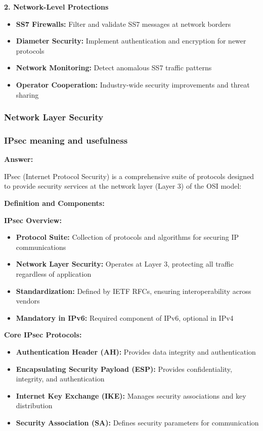 \documentclass[12pt,a4paper]{article}
\begin{document}
\textbf{2. Network-Level Protections}
\begin{itemize}
    \item \textbf{SS7 Firewalls:} Filter and validate SS7 messages at network borders
    \item \textbf{Diameter Security:} Implement authentication and encryption for newer protocols
    \item \textbf{Network Monitoring:} Detect anomalous SS7 traffic patterns
    \item \textbf{Operator Cooperation:} Industry-wide security improvements and threat sharing
\end{itemize}

\subsubsection{Network Layer Security}

\subsubsection{IPsec meaning and usefulness}

\textbf{Answer:}

IPsec (Internet Protocol Security) is a comprehensive suite of protocols designed to provide security services at the network layer (Layer 3) of the OSI model:

\textbf{Definition and Components:}

\textbf{IPsec Overview:}
\begin{itemize}
    \item \textbf{Protocol Suite:} Collection of protocols and algorithms for securing IP communications
    \item \textbf{Network Layer Security:} Operates at Layer 3, protecting all traffic regardless of application
    \item \textbf{Standardization:} Defined by IETF RFCs, ensuring interoperability across vendors
    \item \textbf{Mandatory in IPv6:} Required component of IPv6, optional in IPv4
\end{itemize}

\textbf{Core IPsec Protocols:}
\begin{itemize}
    \item \textbf{Authentication Header (AH):} Provides data integrity and authentication
    \item \textbf{Encapsulating Security Payload (ESP):} Provides confidentiality, integrity, and authentication
    \item \textbf{Internet Key Exchange (IKE):} Manages security associations and key distribution
    \item \textbf{Security Association (SA):} Defines security parameters for communication
\end{itemize}
\end{document}
